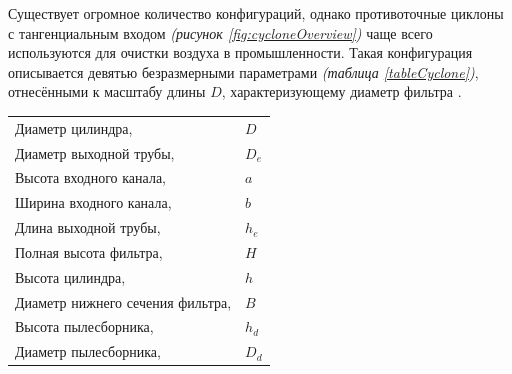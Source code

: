 	Существует огромное количество конфигураций, однако противоточные циклоны с тангенциальным входом \textit{(рисунок \ref{fig:cycloneOverview})} чаще всего используются для очистки воздуха в промышленности. Такая конфигурация описывается девятью безразмерными параметрами \textit{(таблица \ref{tableCyclone})}, отнесёнными к масштабу длины $D$, характеризующему диаметр фильтра \cite{DirgoLeith}.\\
  \begin{minipage}{0.6\textwidth}
			\begin{tabular}{l l}
				\hline
				\label{tableCyclone}
				Диаметр цилиндра, & $D$\\
				Диаметр выходной трубы, & $D_e$\\
				Высота входного канала, & $a$\\
				Ширина входного канала, & $b$\\
				Длина выходной трубы, & $h_e$\\
				Полная высота фильтра, & $H$\\
				Высота цилиндра, & $h$\\
				Диаметр нижнего сечения фильтра, & $B$\\
				Высота пылесборника, & $h_d$\\
				Диаметр пылесборника, & $D_d$\\
			\end{tabular}
    \end{minipage}
    \hspace{1em}
